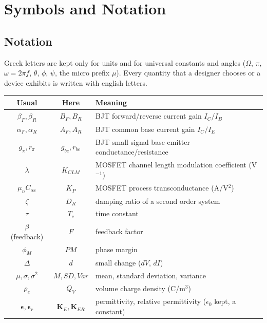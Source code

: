 \chapter{Symbols and Notation}\label{ch:symbols}

\section{Notation}\label{sec:notation}
Greek letters are kept only for units and for universal constants and
angles (\(\Omega\), \(\pi\), \(\omega = 2\pi f\), \(\theta\), \(\phi\),
\(\psi\), the micro prefix \(\mu\)). Every quantity that a designer
chooses or a device exhibits is written with english letters.
\begin{table}[H]
  \centering
  \begin{tabular}{|c|c|l|} \hline
    \textbf{Usual} & \textbf{Here} & \textbf{Meaning} \\ \hline
    \(\beta_F, \beta_R\) & \(B_F, B_R\) & BJT forward/reverse current gain \(I_C/I_B\) \\ \hline
    \(\alpha_F, \alpha_R\) & \(A_F, A_R\) & BJT common base current gain \(I_C/I_E\) \\ \hline
    \(g_\pi, r_\pi\) & \(g_{be}, r_{be}\) & BJT small signal base-emitter conductance/resistance \\ \hline
    \(\lambda\) & \(K_{CLM}\) & MOSFET channel length modulation coefficient (V\(^{-1}\)) \\ \hline
    \(\mu_n C_{ox}\) & \(K_P\) & MOSFET process transconductance (A/V\(^2\)) \\ \hline
    \(\zeta\) & \(D_R\) & damping ratio of a second order system \\ \hline
    \(\tau\) & \(T_c\) & time constant \\ \hline
    \(\beta\) (feedback) & \(F\) & feedback factor \\ \hline
    \(\phi_M\) & \(PM\) & phase margin \\ \hline
    \(\Delta\) & \(d\) & small change (\(dV\), \(dI\)) \\ \hline
    \(\mu, \sigma, \sigma^2\) & \(M, SD, Var\) & mean, standard deviation, variance \\ \hline
    \(\rho_e\) & \(Q_V\) & volume charge density (C/m\(^3\)) \\ \hline
    \(\boldsymbol{\epsilon}, \boldsymbol{\epsilon}_r\) & \(\mathbf{K}_E, \mathbf{K}_{ER}\) & permittivity, relative permittivity (\(\epsilon_0\) kept, a constant) \\ \hline

\end{tabular}
\end{table}
